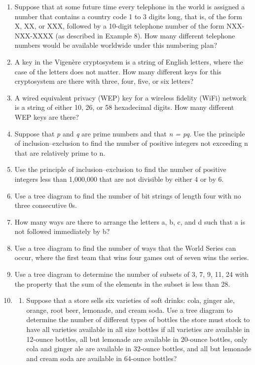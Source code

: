 \documentclass[11pt,a4paper]{book}
\begin{document}
\begin{enumerate}
\item Suppose that at some future time every telephone in the world is assigned a number that contains a country code 1 to 3 digits long, that is, of the form X, XX, or XXX, followed by a 10-digit telephone number of the form NXX-NXX-XXXX (as described in Example 8).
How many different telephone numbers would be available worldwide under this numbering plan?
\item A key in the Vigenère cryptosystem is a string of English letters, where the case of the letters does not matter.
How many different keys for this cryptosystem are there with three, four, five, or six letters?
\item A wired equivalent privacy (WEP) key for a wireless fidelity (WiFi) network is a string of either 10, 26, or 58 hexadecimal digits.
How many different WEP keys are there?
\item Suppose that \emph{p} and \emph{q} are prime numbers and that \emph{n = pq}.
Use the principle of inclusion–exclusion to find the number of positive integers not exceeding n that are relatively prime to n.
\item Use the principle of inclusion–exclusion to find the number of positive integers less than 1,000,000 that are not divisible by either 4 or by 6.
\item Use a tree diagram to find the number of bit strings of length four with no three consecutive 0s.
\item How many ways are there to arrange the letters a, b, c, and d such that a is not followed immediately by b?
\item Use a tree diagram to find the number of ways that the World Series can occur, where the first team that wins four games out of seven wins the series.
\item Use a tree diagram to determine the number of subsets of {3, 7, 9, 11, 24} with the property that the sum of the elements in the subset is less than 28.
\item \begin{enumerate}[label=(\alph*)]
\item Suppose that a store sells six varieties of soft drinks: cola, ginger ale, orange, root beer, lemonade, and cream soda.
Use a tree diagram to determine the number of different types of bottles the store must stock to have all varieties available in all size bottles if all varieties are available in 12-ounce bottles, all but lemonade are available in 20-ounce bottles, only cola and ginger ale are available in 32-ounce bottles, and all but lemonade and cream soda are available in 64-ounce bottles?

\end{enumerate}
\end{enumerate}
\end{document}
